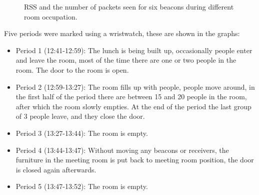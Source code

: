 \begin{figure}[p]
    \begin{subfigure}[b]{0.5\textwidth}
    \end{subfigure}
    \begin{subfigure}[b]{0.5\textwidth}
    \end{subfigure}
    \begin{subfigure}[b]{0.5\textwidth}
    \end{subfigure}
    \begin{subfigure}[b]{0.5\textwidth}
    \end{subfigure}
    \begin{subfigure}[b]{0.5\textwidth}
    \end{subfigure}
    \begin{subfigure}[b]{0.5\textwidth}
    \end{subfigure}
    \caption{RSS and the number of packets seen for six beacons during different room occupation.}
    \label{fig:rss-busyroom}
\end{figure}

Five periods were marked using a wristwatch, these are shown in the graphs:
\begin{itemize}
    \item Period 1 (12:41-12:59): The lunch is being built up, occasionally people enter and leave the room, most of the time there are one or two people in the room.
        The door to the room is open.
    \item Period 2 (12:59-13:27): The room fills up with people, people move around, in the first half of the period there are between 15 and 20 people in the room, after which the room slowly empties.
        At the end of the period the last group of 3 people leave, and they close the door.
    \item Period 3 (13:27-13:44): The room is empty.
    \item Period 4 (13:44-13:47): Without moving any beacons or receivers, the furniture in the meeting room is put back to meeting room position, the door is closed again afterwards.
    \item Period 5 (13:47-13:52): The room is empty.
\end{itemize}

